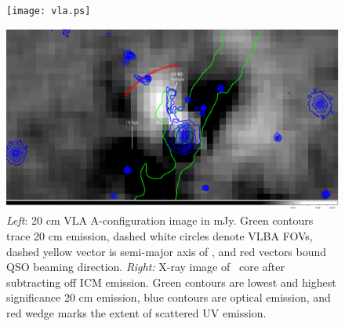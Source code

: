 \documentclass[11pt]{article}
\begin{document}
\clearpage
\begin{figure}[htp]
  \begin{center}
    \begin{minipage}{0.63\linewidth}
      \texttt{[image: vla.ps]}
    \end{minipage}
    \begin{minipage}{0.6\linewidth}
      \includegraphics[width=\textwidth, trim=66mm 25mm 70mm 18mm, clip]{opt_xray.ps}
    \end{minipage}
    \caption{{\it{Left}}: 20 cm VLA A-configuration image in
      mJy. Green contours trace 20 cm emission, dashed white circles
      denote VLBA FOVs, dashed yellow vector is semi-major axis of
      \rxj, and red vectors bound QSO beaming direction. {\it{Right:}}
      X-ray image of \rxj\ core after subtracting off ICM
      emission. Green contours are lowest and highest significance 20
      cm emission, blue contours are optical emission, and red wedge
      marks the extent of scattered UV emission.}
    \label{fig:img}
  \end{center}
\end{figure}
\end{document}
